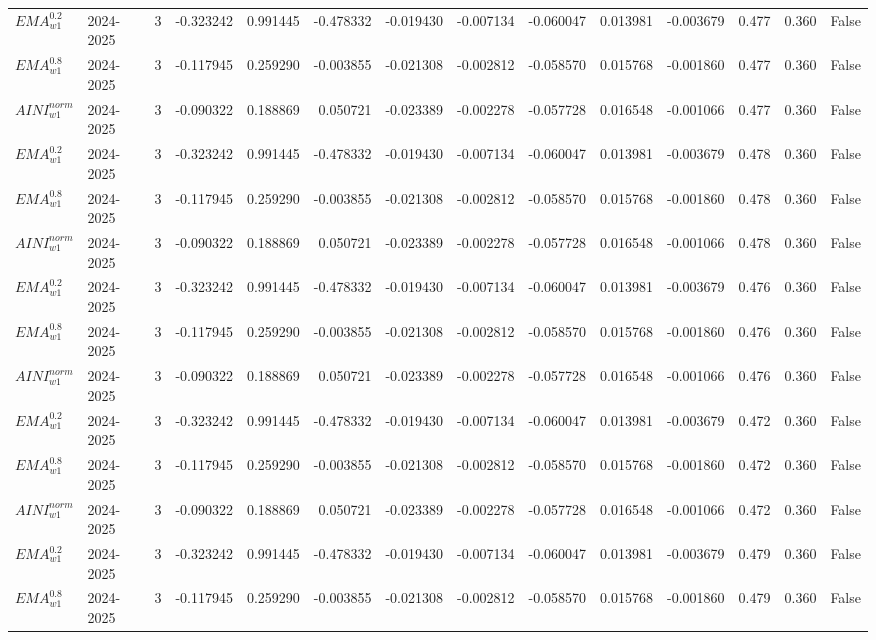 \begin{tabular}{@{}llrrrrrrrrrlll@{}}
$EMA^{0.2}_{w1}$ & 2024-2025 & 3 & -0.323242 & 0.991445 & -0.478332 & -0.019430 & -0.007134 & -0.060047 & 0.013981 & -0.003679 & 0.477 & 0.360 & False \\
$EMA^{0.8}_{w1}$ & 2024-2025 & 3 & -0.117945 & 0.259290 & -0.003855 & -0.021308 & -0.002812 & -0.058570 & 0.015768 & -0.001860 & 0.477 & 0.360 & False \\
$AINI^{norm}_{w1}$ & 2024-2025 & 3 & -0.090322 & 0.188869 & 0.050721 & -0.023389 & -0.002278 & -0.057728 & 0.016548 & -0.001066 & 0.477 & 0.360 & False \\
$EMA^{0.2}_{w1}$ & 2024-2025 & 3 & -0.323242 & 0.991445 & -0.478332 & -0.019430 & -0.007134 & -0.060047 & 0.013981 & -0.003679 & 0.478 & 0.360 & False \\
$EMA^{0.8}_{w1}$ & 2024-2025 & 3 & -0.117945 & 0.259290 & -0.003855 & -0.021308 & -0.002812 & -0.058570 & 0.015768 & -0.001860 & 0.478 & 0.360 & False \\
$AINI^{norm}_{w1}$ & 2024-2025 & 3 & -0.090322 & 0.188869 & 0.050721 & -0.023389 & -0.002278 & -0.057728 & 0.016548 & -0.001066 & 0.478 & 0.360 & False \\
$EMA^{0.2}_{w1}$ & 2024-2025 & 3 & -0.323242 & 0.991445 & -0.478332 & -0.019430 & -0.007134 & -0.060047 & 0.013981 & -0.003679 & 0.476 & 0.360 & False \\
$EMA^{0.8}_{w1}$ & 2024-2025 & 3 & -0.117945 & 0.259290 & -0.003855 & -0.021308 & -0.002812 & -0.058570 & 0.015768 & -0.001860 & 0.476 & 0.360 & False \\
$AINI^{norm}_{w1}$ & 2024-2025 & 3 & -0.090322 & 0.188869 & 0.050721 & -0.023389 & -0.002278 & -0.057728 & 0.016548 & -0.001066 & 0.476 & 0.360 & False \\
$EMA^{0.2}_{w1}$ & 2024-2025 & 3 & -0.323242 & 0.991445 & -0.478332 & -0.019430 & -0.007134 & -0.060047 & 0.013981 & -0.003679 & 0.472 & 0.360 & False \\
$EMA^{0.8}_{w1}$ & 2024-2025 & 3 & -0.117945 & 0.259290 & -0.003855 & -0.021308 & -0.002812 & -0.058570 & 0.015768 & -0.001860 & 0.472 & 0.360 & False \\
$AINI^{norm}_{w1}$ & 2024-2025 & 3 & -0.090322 & 0.188869 & 0.050721 & -0.023389 & -0.002278 & -0.057728 & 0.016548 & -0.001066 & 0.472 & 0.360 & False \\
$EMA^{0.2}_{w1}$ & 2024-2025 & 3 & -0.323242 & 0.991445 & -0.478332 & -0.019430 & -0.007134 & -0.060047 & 0.013981 & -0.003679 & 0.479 & 0.360 & False \\
$EMA^{0.8}_{w1}$ & 2024-2025 & 3 & -0.117945 & 0.259290 & -0.003855 & -0.021308 & -0.002812 & -0.058570 & 0.015768 & -0.001860 & 0.479 & 0.360 & False \\

\end{tabular}
